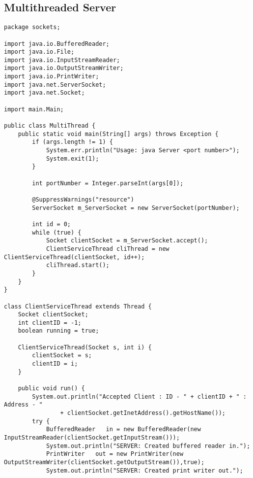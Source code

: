 \documentclass{article}
\begin{document}
	\subsection{Multithreaded Server}
		\begin{lstlisting}
package sockets;

import java.io.BufferedReader;
import java.io.File;
import java.io.InputStreamReader;
import java.io.OutputStreamWriter;
import java.io.PrintWriter;
import java.net.ServerSocket;
import java.net.Socket;

import main.Main;

public class MultiThread {
	public static void main(String[] args) throws Exception {
		if (args.length != 1) {
			System.err.println("Usage: java Server <port number>");
			System.exit(1);
		}

		int portNumber = Integer.parseInt(args[0]);
		
		@SuppressWarnings("resource")
		ServerSocket m_ServerSocket = new ServerSocket(portNumber);
		
		int id = 0;
		while (true) {
			Socket clientSocket = m_ServerSocket.accept();
			ClientServiceThread cliThread = new ClientServiceThread(clientSocket, id++);
			cliThread.start();
		}
	}
}

class ClientServiceThread extends Thread {
	Socket clientSocket;
	int clientID = -1;
	boolean running = true;

	ClientServiceThread(Socket s, int i) {
		clientSocket = s;
		clientID = i;
	}

	public void run() {
		System.out.println("Accepted Client : ID - " + clientID + " : Address - "
				+ clientSocket.getInetAddress().getHostName());
		try {
			BufferedReader   in = new BufferedReader(new InputStreamReader(clientSocket.getInputStream()));
			System.out.println("SERVER: Created buffered reader in.");
			PrintWriter   out = new PrintWriter(new OutputStreamWriter(clientSocket.getOutputStream()),true);
			System.out.println("SERVER: Created print writer out.");
            

\end{lstlisting}
\end{document}

